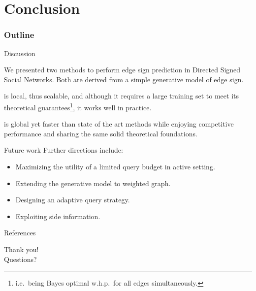\documentclass[10pt,svgnames,ignorenonframetext,final]{beamer}
\providecommand{\largelist}{%
  \setlength{\itemsep}{8pt}\setlength{\parskip}{3pt}}
\begin{document}
\section{Conclusion}\label{conclusion}
  \begin{frame} \frametitle{Outline} \tableofcontents[currentsection] \end{frame}

\begin{frame}{Discussion}

We presented two methods to perform edge sign prediction in Directed Signed
Social Networks. Both are derived from a simple generative model of edge
sign.

\alert{\usrule{} is local}, thus scalable, and although it requires a large training
set to meet its theoretical guarantees\footnote{i.e.~being Bayes optimal
w.h.p.~for all edges simultaneously.}, it works well in practice.

\alert{\uslpropGsec{} is global} yet faster than state of the art
methods while enjoying competitive performance and sharing the same
solid theoretical foundations.

\end{frame}
\begin{frame}{Future work}
Further directions include:

\begin{itemize}
  \largelist
  \item
    Maximizing the utility of a limited query budget in active setting.
  \item
    Extending the generative model to weighted graph.
  \item
    Designing an adaptive query strategy.
  \item
    Exploiting side information.
\end{itemize}

\end{frame}


\begin{frame}[allowframebreaks]{References}
  \printbibliography
\end{frame}

\begin{frame}[plain,c]

\begin{center}
\Huge Thank you! \\ Questions?
\end{center}

\end{frame}
\end{document}
